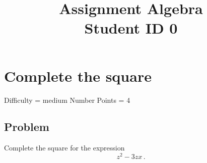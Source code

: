 \documentclass{article}
\title{Assignment Algebra \\ Student ID 0}
\begin{document}
\maketitle

\section{Complete the square}
Difficulty = medium
Number Points = 4
\subsection{Problem}
Complete the square for the expression $$ z^2 - 3zx \,.$$
\vspace{6cm} 
\end{document}
